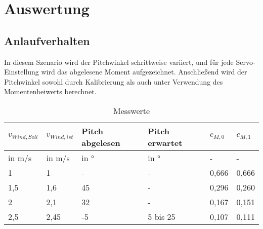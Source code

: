 \section{Auswertung}
\label{sec:Auswertung}
\subsection{Anlaufverhalten}
In diesem Szenario wird der Pitchwinkel schrittweise variiert, und für jede Servo-Einstellung  wird das abgelesene Moment aufgezeichnet. Anschließend wird der Pitchwinkel sowohl durch Kalibrierung als auch unter Verwendung des Momentenbeiwerts berechnet.
\begin{table}[ht!]
    \centering
    \caption{Messwerte}
    \label{tab_Messwerte_Anlauf_230615}
    \begin{tabular}{|l|l|l|l|l|l|}
        \hline
        \rowcolor[HTML]{70AD47} 
        {\color[HTML]{FFFFFF} \textbf{$v_{Wind,Soll}$}} & {\color[HTML]{FFFFFF} \textbf{$v_{Wind,ist}$}} & {\color[HTML]{FFFFFF} \textbf{Pitch abgelesen}} & {\color[HTML]{FFFFFF} \textbf{Pitch erwartet}} & {\color[HTML]{FFFFFF} \textbf{$c_{M,0}$}} & {\color[HTML]{FFFFFF} \textbf{$c_{M,1}$}} \\ \hline
        \rowcolor[HTML]{70AD47} 
        in m/s                                         & in m/s                                      & in °                                            & in °                                           & -                                      & -                                      \\ \hline
        \rowcolor[HTML]{E2EFDA} 
        1                                              & 1                                           & -                                               & -                                              & 0,666                                  & 0,666                                  \\ \hline
        \rowcolor[HTML]{C6E0B4} 
        1,5                                            & 1,6                                         & 45                                              & -                                              & 0,296                                  & 0,260                                  \\ \hline
        \rowcolor[HTML]{E2EFDA} 
        2                                              & 2,1                                         & 32                                              & -                                              & 0,167                                  & 0,151                                  \\ \hline
        \rowcolor[HTML]{C6E0B4} 
        2,5                                            & 2,45                                        & -5                                              & 5 bis 25                                       & 0,107                                  & 0,111                                  \\ \hline
    \end{tabular}
\end{table}


